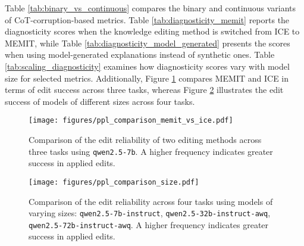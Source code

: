 Table \ref{tab:binary_vs_continuous} compares the binary and continuous variants of CoT-corruption-based metrics. Table \ref{tab:diagnosticity_memit} reports the diagnosticity scores when the knowledge editing method is switched from ICE to MEMIT, while Table \ref{tab:diagnosticity_model_generated} presents the scores when using model-generated explanations instead of synthetic ones. Table \ref{tab:scaling_diagnosticity} examines how diagnosticity scores vary with model size for selected metrics. Additionally, Figure \ref{fig:ppl_comparison_memit_vs_ice} compares MEMIT and ICE in terms of edit success across three tasks, whereas Figure \ref{fig:ppl_comparison_size} illustrates the edit success of models of different sizes across four tasks.



\begin{figure}[htb]
    \centering
    \texttt{[image: figures/ppl\_comparison\_memit\_vs\_ice.pdf]}
    \caption{Comparison of the edit reliability of two editing methods across three tasks using \texttt{qwen2.5-7b}. A higher frequency indicates greater success in applied edits.}
    \label{fig:ppl_comparison_memit_vs_ice}
\end{figure}

\begin{figure}[htb]
    \centering
    \texttt{[image: figures/ppl\_comparison\_size.pdf]}
    \caption{Comparison of the edit reliability across four tasks using models of varying sizes: \texttt{qwen2.5-7b-instruct}, \texttt{qwen2.5-32b-instruct-awq}, \texttt{qwen2.5-72b-instruct-awq}. A higher frequency indicates greater success in applied edits.}
    \label{fig:ppl_comparison_size}
\end{figure}






